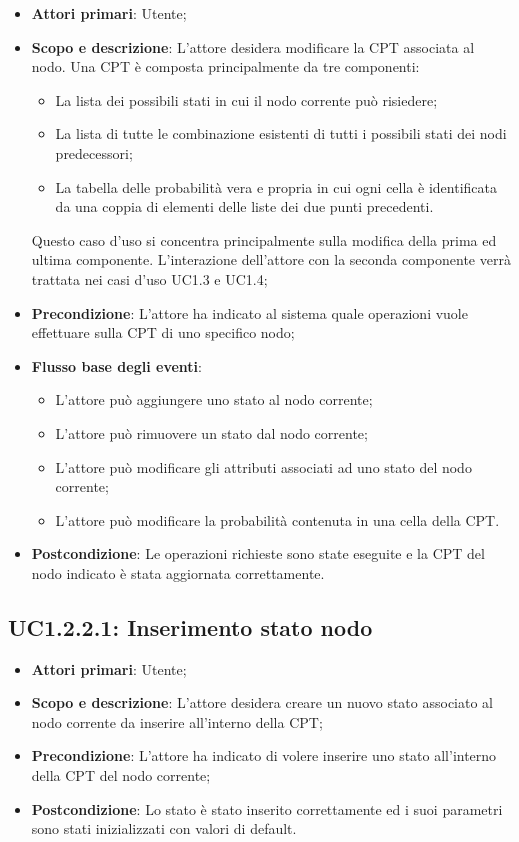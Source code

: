 \begin{itemize} 
	\item{\textbf{Attori primari}: Utente;} 
	\item{\textbf{Scopo e descrizione}: L'attore desidera modificare la CPT associata al nodo. Una CPT è composta principalmente da tre componenti: 
		\begin{itemize} 
			\item{La lista dei possibili stati in cui il nodo corrente può risiedere;} 
			\item{La lista di tutte le combinazione esistenti di tutti i possibili stati dei nodi predecessori;} 
			\item{La tabella delle probabilità vera e propria in cui ogni cella è identificata da una coppia di elementi delle liste dei due punti precedenti.} 
		\end{itemize} 
		Questo caso d'uso si concentra principalmente sulla modifica della prima ed ultima componente. L'interazione dell'attore con la seconda componente verrà trattata nei casi d'uso UC1.3 e UC1.4;
	} 
	\item{\textbf{Precondizione}: L'attore ha indicato al sistema quale operazioni vuole effettuare sulla CPT di uno specifico nodo;} 
	\item{\textbf{Flusso base degli eventi}: } 
	\begin{itemize} 
		\item{L'attore può aggiungere uno stato al nodo corrente;} 
		\item{L'attore può rimuovere un stato dal nodo corrente;} 
		\item{L'attore può modificare gli attributi associati ad uno stato del nodo corrente;} 
		\item{L'attore può modificare la probabilità contenuta in una cella della CPT.} 
	\end{itemize} 
	\item{\textbf{Postcondizione}: Le operazioni richieste sono state eseguite e la CPT del nodo indicato è stata aggiornata correttamente.} 
\end{itemize} 
\subsection{UC1.2.2.1: Inserimento stato nodo} 
\hypertarget{UC1.2.2.1}{} 
\begin{itemize} 
	\item{\textbf{Attori primari}: Utente;} 
	\item{\textbf{Scopo e descrizione}: L'attore desidera creare un nuovo stato associato al nodo corrente da inserire all'interno della CPT;} 
	\item{\textbf{Precondizione}: L'attore ha indicato di volere inserire uno stato all'interno della CPT del nodo corrente;} 
	\item{\textbf{Postcondizione}: Lo stato è stato inserito correttamente ed i suoi parametri sono stati inizializzati con valori di default.} 
\end{itemize} 

